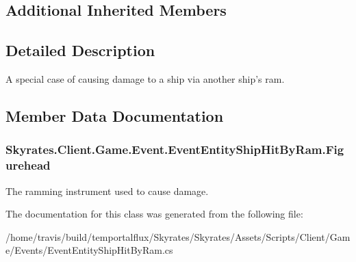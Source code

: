 \subsection*{Additional Inherited Members}


\subsection{Detailed Description}
A special case of causing damage to a ship via another ship's ram. 



\subsection{Member Data Documentation}
\hypertarget{class_skyrates_1_1_client_1_1_game_1_1_event_1_1_event_entity_ship_hit_by_ram_a139003403af668e386ef09085511a81c}{
\subsubsection[{Figurehead}]{ Skyrates.\-Client.\-Game.\-Event.\-Event\-Entity\-Ship\-Hit\-By\-Ram.\-Figurehead}}\label{class_skyrates_1_1_client_1_1_game_1_1_event_1_1_event_entity_ship_hit_by_ram_a139003403af668e386ef09085511a81c}


The ramming instrument used to cause damage. 



The documentation for this class was generated from the following file\-:\begin{DoxyCompactItemize}
\item 
/home/travis/build/temportalflux/\-Skyrates/\-Skyrates/\-Assets/\-Scripts/\-Client/\-Game/\-Events/Event\-Entity\-Ship\-Hit\-By\-Ram.\-cs\end{DoxyCompactItemize}
